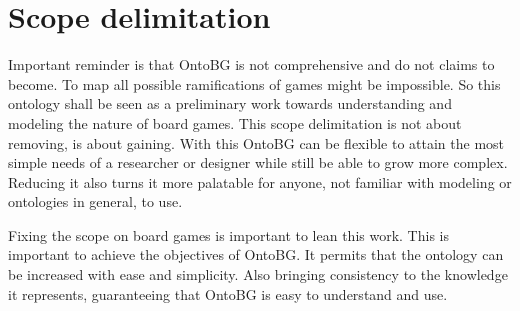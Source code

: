\section{Scope delimitation} 

Important reminder is that OntoBG is not comprehensive and do not claims to become. To map all possible ramifications of games might be impossible. So this ontology shall be seen as a preliminary work towards understanding and modeling the nature of board games. This scope delimitation is not about removing, is about gaining. With this OntoBG can be flexible to attain the most simple needs of a researcher or designer while still be able to grow more complex. Reducing it also turns it more palatable for anyone, not familiar with modeling or ontologies in general, to use.

Fixing the scope on board games is important to lean this work. This is important to achieve the objectives of OntoBG. It permits that the ontology can be increased with ease and simplicity. Also bringing consistency to the knowledge it represents, guaranteeing that OntoBG is easy to understand and use.